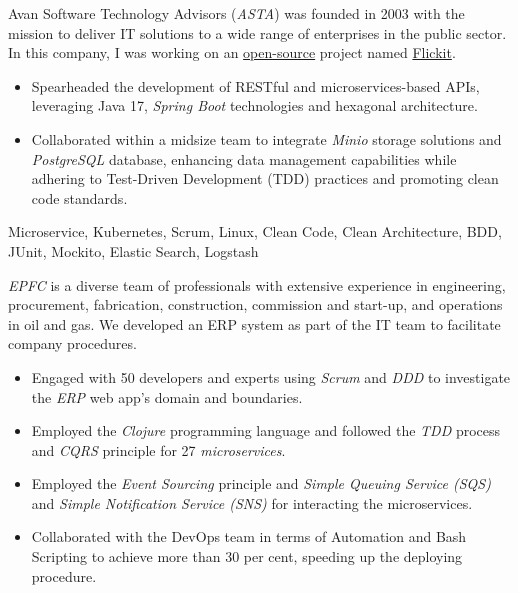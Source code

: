 \begin{experiences}
{
  Avan Software Technology Advisors (\emph{ASTA}) was founded in 2003 with the mission to deliver IT solutions to a wide range of enterprises in the public sector. In this company, I was working on an \href{https://github.com/flickit-platform/flickit-assessment}{open-source} project named \href{https://flickit.org/}{Flickit}.
  \begin{itemize}
    \item Spearheaded the development of RESTful and microservices-based APIs, leveraging Java 17, \emph{Spring Boot} technologies and hexagonal architecture.
    \item Collaborated within a midsize team to integrate \emph{Minio} storage solutions and \emph{PostgreSQL} database, enhancing data management capabilities while adhering to Test-Driven Development (TDD) practices and promoting clean code standards. \end{itemize}}
  {Microservice, Kubernetes, Scrum, Linux, Clean Code, Clean Architecture, BDD, JUnit, Mockito, Elastic Search, Logstash} 
 \emptySeparator
 {
   \emph{EPFC} is a diverse team of professionals with extensive experience in engineering, procurement, fabrication, construction, commission and start-up, and operations in oil and gas. We developed an ERP system as part of the IT team to facilitate company procedures.
   \begin{itemize}
   \item Engaged with 50 developers and experts using \emph{Scrum} and \emph{DDD} to investigate the \textit{ERP} web app's domain and boundaries.
   \item Employed the \emph{Clojure} programming language and followed the \emph{TDD} process and \textit{CQRS} principle for 27 \emph{microservices}.
   \item Employed the \textit{Event Sourcing} principle and \textit{Simple Queuing Service (SQS)} and \textit{Simple Notification Service (SNS)} for interacting the microservices.
   \item Collaborated with the DevOps team in terms of Automation and Bash Scripting to achieve more than 30 per cent, speeding up the deploying procedure.

\end{itemize}}
\end{experiences}
